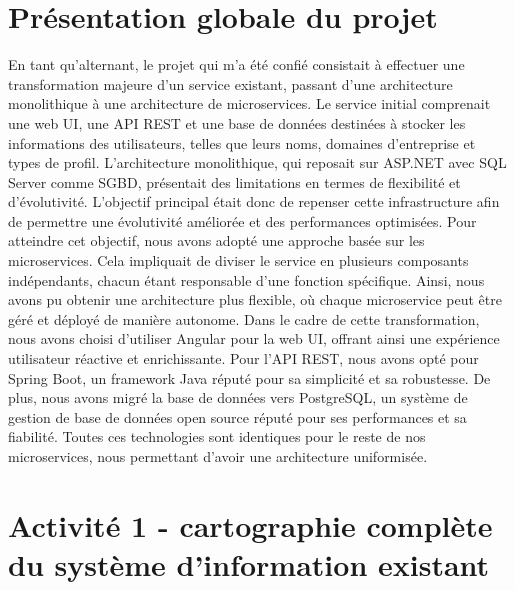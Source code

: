 \documentclass[a4paper, 11pt]{report}
\begin{document}
\section{Présentation globale du projet}
En tant qu'alternant, le projet qui m'a été confié consistait à effectuer une transformation majeure d'un service existant, passant d'une architecture monolithique à une architecture de microservices.
Le service initial comprenait une web UI, une API REST et une base de données destinées à stocker les informations des utilisateurs, telles que leurs noms, domaines d'entreprise et types de profil.
L'architecture monolithique, qui reposait sur ASP.NET avec SQL Server comme SGBD, présentait des limitations en termes de flexibilité et d'évolutivité.
L'objectif principal était donc de repenser cette infrastructure afin de permettre une évolutivité améliorée et des performances optimisées.
Pour atteindre cet objectif, nous avons adopté une approche basée sur les microservices.
Cela impliquait de diviser le service en plusieurs composants indépendants, chacun étant responsable d'une fonction spécifique.
Ainsi, nous avons pu obtenir une architecture plus flexible, où chaque microservice peut être géré et déployé de manière autonome.
Dans le cadre de cette transformation, nous avons choisi d'utiliser Angular pour la web UI, offrant ainsi une expérience utilisateur réactive et enrichissante.
Pour l'API REST, nous avons opté pour Spring Boot, un framework Java réputé pour sa simplicité et sa robustesse.
De plus, nous avons migré la base de données vers PostgreSQL, un système de gestion de base de données open source réputé pour ses performances et sa fiabilité.
Toutes ces technologies sont identiques pour le reste de nos microservices, nous permettant d’avoir une architecture uniformisée.

\section{Activité 1 - cartographie complète du système d'information existant}
\end{document}
